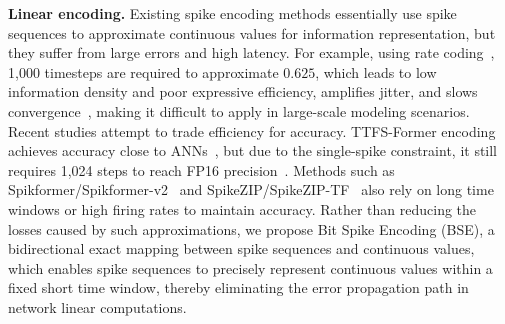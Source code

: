 \documentclass{article}
\theoremstyle{plain}
\theoremstyle{definition}
\theoremstyle{remark}
\begin{document}
\noindent\textbf{Linear encoding.} Existing spike encoding methods essentially use spike sequences to approximate continuous values for information representation, but they suffer from large errors and high latency. For example, using rate coding~\citep{rueckauer2017conversion}, 1{,}000 timesteps are required to approximate $0.625$, which leads to low information density and poor expressive efficiency, amplifies jitter, and slows convergence~\citep{auge2021encoding,guo2021coding}, making it difficult to apply in large-scale modeling scenarios. Recent studies attempt to trade efficiency for accuracy. TTFS-Former encoding achieves accuracy close to ANNs~\citep{ZhaoHuangDingYu2025_TTFSFormer}, but due to the single-spike constraint, it still requires 1{,}024 steps to reach FP16 precision~\citep{stanojevic2024ttfs}. Methods such as Spikformer/Spikformer-v2~\citep{zhou2023spikformer,zhou2024spikformerv2} and SpikeZIP/SpikeZIP-TF~\citep{you2024spikeziptf} also rely on long time windows or high firing rates to maintain accuracy. Rather than reducing the losses caused by such approximations, we propose Bit Spike Encoding (BSE), a bidirectional exact mapping between spike sequences and continuous values, which enables spike sequences to precisely represent continuous values within a fixed short time window, thereby eliminating the error propagation path in network linear computations.  

\end{document}
